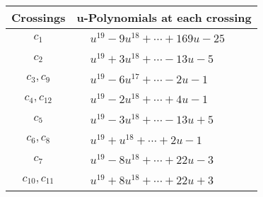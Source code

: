 \documentclass[1p]{elsarticle_modified}
\theoremstyle{definition}
\begin{document}
\begin{tabular}{m{50pt}|m{274pt}}
Crossings & \hspace{64pt}u-Polynomials at each crossing \\
\hline $$\begin{aligned}c_{1}\end{aligned}$$&$\begin{aligned}
&u^{19}-9 u^{18}+\cdots+169 u-25
\end{aligned}$\\
\hline $$\begin{aligned}c_{2}\end{aligned}$$&$\begin{aligned}
&u^{19}+3 u^{18}+\cdots-13 u-5
\end{aligned}$\\
\hline $$\begin{aligned}c_{3},c_{9}\end{aligned}$$&$\begin{aligned}
&u^{19}-6 u^{17}+\cdots-2 u-1
\end{aligned}$\\
\hline $$\begin{aligned}c_{4},c_{12}\end{aligned}$$&$\begin{aligned}
&u^{19}-2 u^{18}+\cdots+4 u-1
\end{aligned}$\\
\hline $$\begin{aligned}c_{5}\end{aligned}$$&$\begin{aligned}
&u^{19}-3 u^{18}+\cdots-13 u+5
\end{aligned}$\\
\hline $$\begin{aligned}c_{6},c_{8}\end{aligned}$$&$\begin{aligned}
&u^{19}+u^{18}+\cdots+2 u-1
\end{aligned}$\\
\hline $$\begin{aligned}c_{7}\end{aligned}$$&$\begin{aligned}
&u^{19}-8 u^{18}+\cdots+22 u-3
\end{aligned}$\\
\hline $$\begin{aligned}c_{10},c_{11}\end{aligned}$$&$\begin{aligned}
&u^{19}+8 u^{18}+\cdots+22 u+3
\end{aligned}$\\
\hline
\end{tabular}\\~\\
\end{document}
